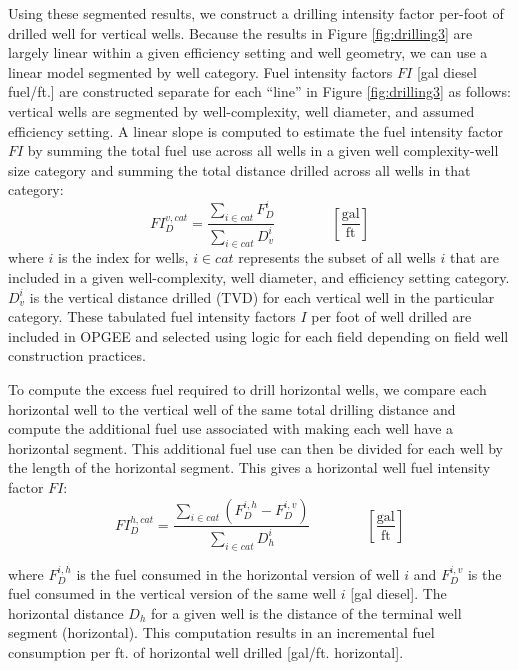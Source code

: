 \documentclass[11pt]{report}
\newcommand{\eqnunitfrac}[2]{\quad\quad \scriptstyle{\left[\frac{\text{#1}}{\text{#2}}\right]}}
\begin{document}
Using these segmented results, we construct a drilling intensity factor per-foot of drilled well for vertical wells.  Because the results in Figure \ref{fig:drilling3} are largely linear within a given efficiency setting and well geometry, we can use a linear model segmented by well category. Fuel intensity factors $FI$ [gal diesel fuel/ft.] are constructed separate for each ``line'' in Figure \ref{fig:drilling3} as follows: vertical wells are segmented by well-complexity, well diameter, and assumed efficiency setting.  A linear slope is computed to estimate the fuel intensity factor $FI$ by summing the total fuel use across all wells in a given well complexity-well size category and summing the total distance drilled across all wells in that category:
\begin{equation}
FI_{D}^{v,cat} = \frac{\sum_{i \in cat} F_{D}^{i}}{\sum_{i \in cat} D_{v}^{i}}
\quad\quad\eqnunitfrac{gal}{ft}
\end{equation}
where $i$ is the index for wells, $i \in cat$ represents the subset of all wells $i$ that are included in a given well-complexity, well diameter, and efficiency setting category.  $D_{v}^{i}$ is the vertical distance drilled (TVD) for each vertical well in the particular category.  These tabulated fuel intensity factors $I$ per foot of well drilled are included in OPGEE and selected using logic for each field depending on field well construction practices.

To compute the excess fuel required to drill horizontal wells, we compare each horizontal well to the vertical well of the same total drilling distance and compute the additional fuel use associated with making each well have a horizontal segment.  This additional fuel use can then be divided for each well by the length of the horizontal segment. This gives a horizontal well fuel intensity factor $FI$:
\begin{equation}
FI_{D}^{h,cat} = \frac{\sum_{i \in cat} \left(F_{D}^{i,h} - F_{D}^{i,v} \right)}{\sum_{i \in cat} D_{h}^{i}} \quad\quad\eqnunitfrac{gal}{ft}
\end{equation}

where $F_{D}^{i,h}$ is the fuel consumed in the horizontal version of well $i$ and $F_{D}^{i,v}$ is the fuel consumed in the vertical version of the same well $i$ [gal diesel].  The horizontal distance $D_{h}$ for a given well is the distance of the terminal well segment (horizontal).  This computation results in an incremental fuel consumption per ft. of horizontal well drilled [gal/ft. horizontal]. 
\end{document}
